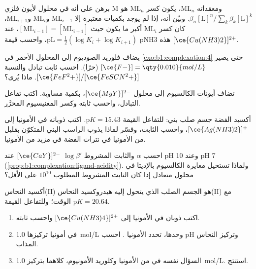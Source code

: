 \begin{exercise}[$\star\star$]\label{exo:b1:complexation:5}
برهن على أنه في محلول لأيون فلزي M ومعقداته
$\mathrm{ML}_n$، يكون كسر $\mathrm{ML}_n$ هو
$\beta_n[\mathrm{L}]^n / \sum_{k} \beta_k[\mathrm{L}]^k$. وبيّن أنه،
إذا لم يوجد بكميات معتبرة إلا $\mathrm{ML}_{i-1}$ و$\mathrm{ML}_i$ و$\mathrm{ML}_{i+1}$،
كان كسر $\mathrm{ML}_i$ أكبر ما يكون حيث $[\mathrm{ML}_{i-1}] = [\mathrm{ML}_{i+1}]$، عند
$\mathrm{pL} = \frac12(\log K_i + \log K_{i+1})$، واحسب قيمة pNH3 هذه
 $[\ce{Cu(NH3)2}]^{2+}$.
\end{exercise}

\begin{exercise}[$\star\star$]\label{exo:b1:complexation:6}
يضاف فلوريد الصوديوم إلى المحلول الأحمر في \cref{exo:b1:complexation:4}
حتى يصير $[\ce{F-}] = \qty{0.010}{mol/L}$ (حرًا). احسب ثابت
تبادل  والنسبة $[\ce{FeF^2+}]/[\ce{FeSCN^2+}]$.
ماذا يُرى؟
\end{exercise}

\begin{exercise}[$\star\star$]\label{exo:b1:complexation:7}
تضاف أيونات الكالسيوم إلى محلول $[\ce{MgY}]^{2-}$، بكمية
مساوية. اكتب تفاعل التبادل، واحسب ثابته
وكسر المغنيسيوم المحرَّر.
\end{exercise}

\begin{exercise}[$\star\star$]\label{exo:b1:complexation:8}
أكسيد الفضة  جسم صلب بني: للتفاعل 
القيمة $\mathrm{p}K = 15.43$. اكتب ذوبانه في الأمونيا إلى
$[\ce{Ag(NH3)2}]^{+}$، واحسب الثابت، وفسّر لماذا يذوب الراسب
البني المتكوّن بقليل من الأمونيا في نترات الفضة في
مزيد من الأمونيا.
\end{exercise}

\begin{exercise}[$\star\star$]\label{exo:b1:complexation:9}
احسب $\alpha$ والثابت المشروط $\log\beta'$  $[\ce{CaY}]^{2-}$
عند pH 10 وعند pH 7 (\cref{prop:b1:complexation:ligand-acidity}). ولماذا
تستحيل معايرة الكالسيوم بالإديتا في محلول متعادل إذا كان
الثابت المشروط المطلوب $10^{10}$ على الأقل؟
\end{exercise}

\begin{exercise}[$\star\star\star$]\label{exo:b1:complexation:10}
أكسيد النحاس(II)  هو الجسم الصلب الذي يتحول إليه هيدروكسيد النحاس(II)
مع الوقت؛ وللتفاعل  القيمة $\mathrm{p}K = 20.64$.
\begin{enumerate}
  \item اكتب ذوبان  في الأمونيا إلى
        $[\ce{Cu(NH3)4}]^{2+}$ واحسب ثابته.
  \item في أمونيا تركيزها \qty{1.0}{mol/L} وحدها، تحدد الأمونيا
        . احسب pH
        وتركيز النحاس المذاب.
  \item السؤال نفسه في  من الأمونيا وكلوريد الأمونيوم، كلاهما
        بتركيز \qty{1.0}{mol/L}. استنتج.
\end{enumerate}
\end{exercise}


